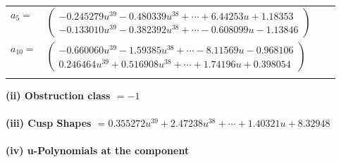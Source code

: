 \documentclass[1p]{elsarticle_modified}
\theoremstyle{definition}
\begin{document}
\begin{tabular}{m{7pt} m{180pt} m{7pt} m{180pt} }
\flushright $a_{5}=$&$\begin{pmatrix}-0.245279 u^{39}-0.480339 u^{38}+\cdots+6.44253 u+1.18353\\-0.133010 u^{39}-0.382392 u^{38}+\cdots-0.608099 u-1.13846\end{pmatrix}$ \\
\flushright $a_{10}=$&$\begin{pmatrix}-0.660060 u^{39}-1.59385 u^{38}+\cdots-8.11569 u-0.968106\\0.246464 u^{39}+0.516908 u^{38}+\cdots+1.74196 u+0.398054\end{pmatrix}$\\&\end{tabular}
\flushleft \textbf{(ii) Obstruction class $= -1$}\\~\\
\flushleft \textbf{(iii) Cusp Shapes $= 0.355272 u^{39}+2.47238 u^{38}+\cdots+1.40321 u+8.32948$}\\~\\
\newpage\renewcommand{\arraystretch}{1}
\flushleft \textbf{(iv) u-Polynomials at the component}\newline \\
\end{document}
